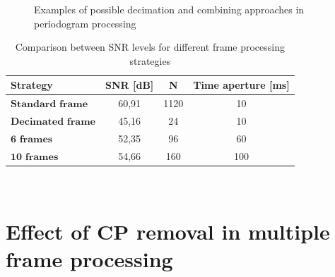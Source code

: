 \begin{figure}[H]
        \hfill
        
        \caption{Examples of possible decimation and combining approaches in periodogram processing}
        \label{fig:allperiodogram-decimation}
    \end{figure}


    
\begin{table}[H]
    \centering 
    \begin{tabular}{|p{9em} c c c |}
    \hline
    \rowcolor{bluepoli!40} %
     \textbf{Strategy} & \textbf{SNR [dB]} & \textbf{N} & \textbf{Time aperture [ms]} \T\B \\
    \hline \hline
    $\textbf{Standard frame}$ & 60,91 & 1120 & 10 \T\B \\
    $\textbf{Decimated frame}$ & 45,16 & 24 & 10 \T\B\\
    $\textbf{6 frames}$ & 52,35 & 96 & 60  \T\B\\
    $\textbf{10 frames}$ & 54,66 & 160 & 100  \T\B\\

    \hline
    \end{tabular}
    \\[10pt]
    \caption{Comparison between SNR levels for different frame processing strategies}
    \label{table:TDDstratcomparison}
\end{table}


\section{Effect of CP removal in multiple frame processing}
